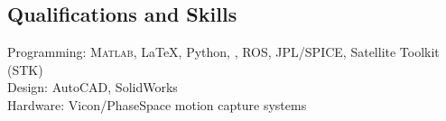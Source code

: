 \subsection*{Qualifications and Skills}
{}

Programming: \textsc{Matlab}, \LaTeX{}, Python, \CC, ROS, JPL/SPICE, Satellite Toolkit (STK)  \\
Design: AutoCAD, SolidWorks \\
Hardware: Vicon/PhaseSpace motion capture systems